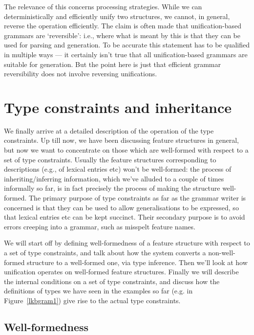 \documentclass[12pt]{report}
\begin{document}
\begin{enumerate}
The relevance of this concerns
processing strategies.  While we can deterministically
and efficiently unify two structures, we cannot, in general, reverse
the operation efficiently.  The claim is
often made that unification-based grammars are `reversible': i.e., 
where what is meant by this is that
they can be used for parsing and generation.  To be accurate this
statement has to be qualified in multiple ways --- it certainly
isn't true that all unification-based grammars are suitable for
generation.  But the point here is just that efficient
grammar reversibility
does not involve reversing unifications.

\end{enumerate}

\section{Type constraints and inheritance}
\label{wf}

We finally arrive at a detailed description of the operation of
the type constraints.  Up till now, we have been discussing
feature structures in general, but now we want to concentrate
on those which are well-formed with respect to a set
of type constraints.
Usually the feature structures
corresponding to descriptions (e.g., of lexical entries etc) won't
be well-formed: the process of inheriting/inferring information, which we've
alluded to a couple of times informally so far, is in fact precisely the
process of making the structure well-formed. 
The primary purpose of type constraints as far as the grammar
writer is concerned is that they can be used to allow generalisations
to be expressed, so that lexical entries etc can be kept
succinct.  Their secondary purpose is to avoid errors
creeping into a grammar, such as misspelt feature names.

We will start off by defining well-formedness of a feature structure
with respect to a set of type constraints, and talk about 
how the system converts a non-well-formed structure to a well-formed one,
via type inference.  Then we'll look at how unification
operates on well-formed feature structures.  Finally we will
describe the internal conditions on a set of type constraints,
and discuss how the definitions of types we have seen in the
examples so far (e.g. in Figure~\ref{lkbgram1}) give rise to
the actual type constraints.

\subsection{Well-formedness}
\end{document}
